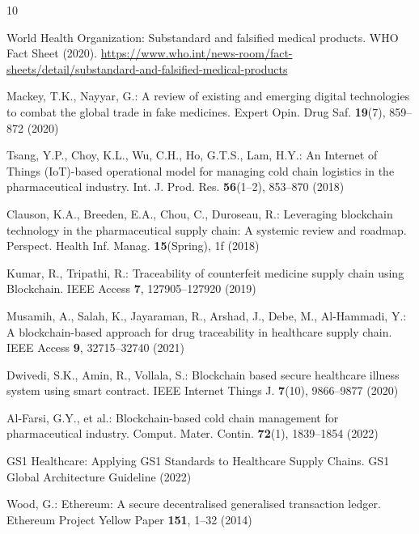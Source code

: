 \documentclass[pdflatex,sn-mathphys-num]{sn-jnl}
\theoremstyle{thmstyleone}
\theoremstyle{thmstyletwo}
\theoremstyle{thmstylethree}
\begin{document}
\begin{thebibliography}{10}

World Health Organization: Substandard and falsified medical products. WHO Fact Sheet (2020). \url{https://www.who.int/news-room/fact-sheets/detail/substandard-and-falsified-medical-products}

Mackey, T.K., Nayyar, G.: A review of existing and emerging digital technologies to combat the global trade in fake medicines. Expert Opin. Drug Saf. \textbf{19}(7), 859--872 (2020)

Tsang, Y.P., Choy, K.L., Wu, C.H., Ho, G.T.S., Lam, H.Y.: An Internet of Things (IoT)-based operational model for managing cold chain logistics in the pharmaceutical industry. Int. J. Prod. Res. \textbf{56}(1--2), 853--870 (2018)

Clauson, K.A., Breeden, E.A., Chou, C., Duroseau, R.: Leveraging blockchain technology in the pharmaceutical supply chain: A systemic review and roadmap. Perspect. Health Inf. Manag. \textbf{15}(Spring), 1f (2018)

Kumar, R., Tripathi, R.: Traceability of counterfeit medicine supply chain using Blockchain. IEEE Access \textbf{7}, 127905--127920 (2019)

Musamih, A., Salah, K., Jayaraman, R., Arshad, J., Debe, M., Al-Hammadi, Y.: A blockchain-based approach for drug traceability in healthcare supply chain. IEEE Access \textbf{9}, 32715--32740 (2021)

Dwivedi, S.K., Amin, R., Vollala, S.: Blockchain based secure healthcare illness system using smart contract. IEEE Internet Things J. \textbf{7}(10), 9866--9877 (2020)

Al-Farsi, G.Y., et al.: Blockchain-based cold chain management for pharmaceutical industry. Comput. Mater. Contin. \textbf{72}(1), 1839--1854 (2022)

GS1 Healthcare: Applying GS1 Standards to Healthcare Supply Chains. GS1 Global Architecture Guideline (2022)

Wood, G.: Ethereum: A secure decentralised generalised transaction ledger. Ethereum Project Yellow Paper \textbf{151}, 1--32 (2014)

\end{thebibliography}
\end{document}
